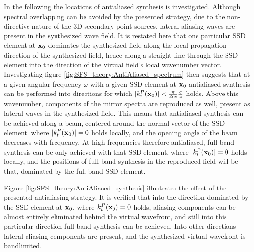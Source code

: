 In the following the locations of antialiased synthesis is investigated.
Although spectral overlapping can be avoided by the presented strategy, due to the non-directive nature of the 3D secondary point sources, lateral aliasing waves are present in the synthesized wave field.
It is restated here that one particular SSD element at $\mathbf{x}_0$ dominates the synthesized field along the local propagation direction of the synthesized field, hence along a straight line through the SSD element into the direction of the virtual field's local wavenumber vector.
Investigating figure \ref{fig:SFS_theory:AntiAliased_spectrum} then suggests that at a given angular frequency $\omega$ with a given SSD element at $\mathbf{x}_0$ antialiased synthesis can be performed into directions for which $|k^P_t(\mathbf{x}_0)| < \frac{\pi}{\Delta x} \frac{c}{\omega}$ holds.
Above this wavenumber, components of the mirror spectra are reproduced as well, present as lateral waves in the synthesized field. 
This means that antialiased synthesis can be achieved along a beam, centered around the normal vector of the SSD element, where $|k^P_t(\mathbf{x}_0)| = 0$ holds locally, and the opening angle of the beam decreases with frequency.
At high frequencies therefore antialiased, full band synthesis can be only achieved with that SSD element, where $|k^P_t(\mathbf{x}_0)| = 0$ holds locally, and the positions of full band synthesis in the reproduced field will be that, dominated by the full-band SSD element.

Figure \ref{fig:SFS_theory:AntiAliased_synthesis} illustrates the effect of the presented antialiasing strategy.
It is verified that into  the direction dominated by the SSD element at $\mathbf{x}_0$, where $k^P_t(\mathbf{x}_0) = 0$ holds, aliasing components can be almost entirely eliminated behind the virtual wavefront, and still into this particular direction full-band synthesis can be achieved.
Into other directions lateral aliasing components are present, and the synthesized virtual wavefront is bandlimited.

